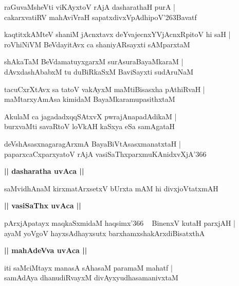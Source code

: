 \documentclass[twoside,12pt,openright]{book}
\def\S{\char'263}
\newcounter{shloka}[chapter]
\def\uvaca#1{\centerline{{\large\textbf{#1}}}}
\begin{document}
\begin{shloka}%
raGuvaMsheVti viKAyxtoV rAjA dasharathaH purA |\\
cakarxvatiRV mahAviVraH sapatxdivxVpAdhipoV\S Bavatf
\end{shloka}

\begin{shloka}%
kaqtitxkAMteV shaniM jAcnxtavx deYvajecnxYVjAcnxRpitoV hi saH |\\
roVhiNiVM BeVdayitAvx ca shaniyARsayxti sAMparxtaM
\end{shloka}

\begin{shloka}%
shAkaTaM BeVdamatuyxgarxM surAsuraBayaMkaraM |\\
dAvxdashAbabxM tu duBiRkaSxM BaviSayxti sudAruNaM
\end{shloka}

\begin{shloka}%
tacuCxrXtAvx sa tatoV vakAyxM maMtiBisasxha pAthiRvaH |\\
maMtarxyAmAsa kimidaM BayaMkaramupasithxtaM 
\end{shloka}

\begin{shloka}%
AkulaM ca jagadadxqqSAtxvX pwrajAnapadAdikaM |\\
burxvaMti savaRtoV loVkAH kaSxya eSa samAgataH
\end{shloka}

\begin{shloka}%
deVshAsasxnagaragArxmA BayaBiVtAsasxmanatxtaH |\\
paparxcaCxparxyatoV rAjA vasiSaThxparxmuKAnidxvXjA\char'366
\end{shloka}

\uvaca{|| dasharatha uvAca ||}

\begin{shloka}%
saMvidhAnaM kirxmatArxsetxV bUrxta mAM hi divxjoVtatxmAH 
\end{shloka}

\uvaca{|| vasiSaThx uvAca ||}

\begin{shloka}%
pArxjApatayx maqkaSxmidaM haqsimx\char'366 ~ BinenxV kutaH parxjAH |\\
ayaM yoVgoV hayxsAdhayxsutx barxhamxshakArxdiBisatxthA
\end{shloka}

\uvaca{|| mahAdeVva uvAca ||}

\begin{shloka}%
iti saMciMtayx manasA sAhasaM paramaM mahatf |\\
samAdAya dhanudiRvayxM divAyxyudhasamanivxtaM 
\end{shloka}
\end{document}
